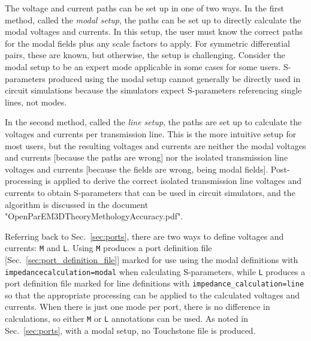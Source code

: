 \documentclass[titlepage]{article}
\renewcommand\_{\textunderscore\linebreak[1]}
\begin{document}
The voltage and current paths can be set up in one of two ways.  In the first method, called the \textit{modal setup}, the paths can be set up to directly calculate the modal voltages and currents.  In this setup, the user must know the correct paths for the modal fields plus any scale factors to apply.  For symmetric differential pairs, these are known, but otherwise, the setup is challenging.  Consider the modal setup to be an expert mode applicable in some cases for some users.  S-parameters produced using the modal setup cannot generally be directly used in circuit simulations because the simulators expect S-parameters referencing single lines, not modes.

In the second method, called the \textit{line setup}, the paths are set up to calculate the voltages and currents per transmission line.  This is the more intuitive setup for most users, but the resulting voltages and currents are neither the modal voltages and currents [because the paths are wrong] nor the isolated transmission line voltages and currents [because the fields are wrong, being modal fields].  Post-processing is applied to derive the correct isolated transmission line voltages and currents to obtain S-parameters that can be used in circuit simulators, and the algorithm is discussed in the document "OpenParEM3D\_Theory\_Methology\_Accuracy.pdf".

Referring back to Sec.~\ref{sec:ports}, there are two ways to define voltages and currents: \texttt{\_M} and \texttt{\_L}.  \newline Using \texttt{\_M} produces a port definition file [Sec.~\ref{sec:port_definition_file}] marked for use using the modal definitions with \newline \texttt{impedance\_calculation=modal} when calculating S-parameters, while \texttt{\_L} produces a port definition file marked for line definitions with \verb+impedance_calculation=line+ so that the appropriate processing can be applied to the calculated voltages and currents.
When there is just one mode per port, there is no difference in calculations, so either \texttt{\_M} or \texttt{\_L} annotations can be used.  As noted in Sec.~\ref{sec:ports}, with a modal setup, no Touchstone file is produced.
 
\end{document}
